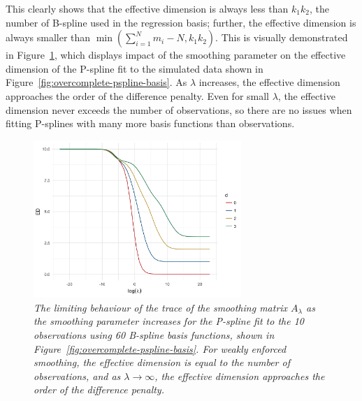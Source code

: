 This clearly shows that the effective dimension is always less than $k_1k_2$, the number of B-spline used in the regression basis; further, the effective dimension is always smaller than $\min\left(\sum_{i=1}^N m_i - N, k_1k_2\right)$. This is visually demonstrated in Figure~\ref{fig:pspline-limiting-effective-dimension}, which displays impact of the smoothing parameter on the effective dimension of the P-spline fit to the simulated data shown in Figure~\ref{fig:overcomplete-pspline-basis}. As $\lambda$ increases, the effective dimension approaches the order of the difference penalty. Even for small $\lambda$, the effective dimension never exceeds the number of observations, so there are no issues when fitting P-splines with many more basis functions than observations. 

\begin{figure}[H]
\begin{center}
\graphicspath{{img/}}
 \includegraphics[width=0.7\textwidth]{pspline-limiting-effective-dimension}
\caption{\textit{The limiting behaviour of the trace of the smoothing matrix $A_\lambda$ as the smoothing parameter increases for the P-spline fit to the 10 observations using 60 B-spline basis functions, shown in Figure~\ref{fig:overcomplete-pspline-basis}. For weakly enforced smoothing, the effective dimension is equal to the number of observations, and as $\lambda \rightarrow \infty$, the effective dimension approaches the order of the difference penalty.}} \label{fig:pspline-limiting-effective-dimension}
\end{center}
\end{figure}

